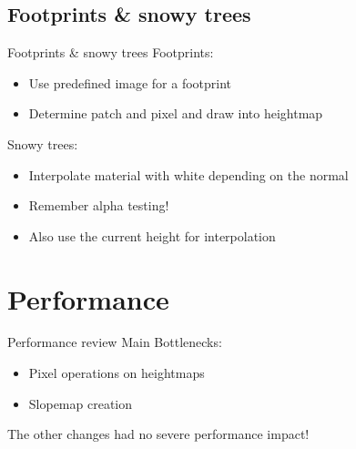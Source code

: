 \documentclass[18pt]{beamer}
\begin{document}
\subsection{Footprints \& snowy trees}
\begin{frame}{Footprints \& snowy trees}
Footprints:
\begin{itemize}
	\item Use predefined image for a footprint
	\item Determine patch and pixel and draw into heightmap
\end{itemize}
\vspace{0.7cm}
Snowy trees:
\begin{itemize}
	\item Interpolate material with white depending on the normal
	\item Remember alpha testing!
	\item Also use the current height for interpolation
\end{itemize}
\end{frame}

\section{Performance}
\begin{frame}{Performance review}
Main Bottlenecks:
\begin{itemize}
	\item Pixel operations on heightmaps
	\item Slopemap creation
\end{itemize}
\vspace{1.0cm}
The other changes had no severe performance impact!
\end{frame}
\end{document}
